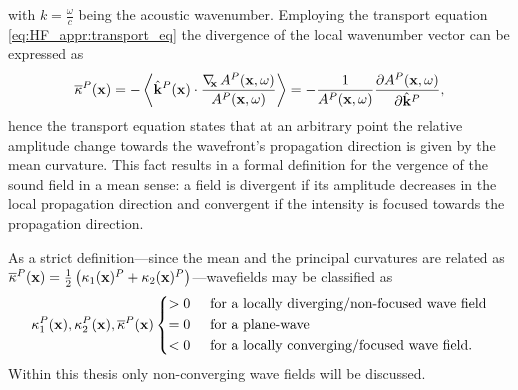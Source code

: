 %
with $k = \frac{\omega}{c}$ being the acoustic wavenumber.
Employing the transport equation \eqref{eq:HF_appr:transport_eq} the divergence of the local wavenumber vector can be expressed as
\begin{equation}
\overline{\kappa}^P(\mathbf{x})
= -\left< \hat{\mathbf{k}}^P(\mathbf{x})\cdot \frac{ \nabla_{\!\!\mathbf{x}}\, A^P(\mathbf{x},\omega) }{A^P(\mathbf{x},\omega)}\right>
= -\frac{ 1 }{ A^P(\mathbf{x},\omega)} \frac{\partial A^P(\mathbf{x},\omega)}{\partial \hat{\mathbf{k}}^P},
\end{equation}
hence the transport equation states that at an arbitrary point the relative amplitude change towards the wavefront's propagation direction is given by the mean curvature.
This fact results in a formal definition for the vergence of the sound field in a mean sense: a field is divergent if its amplitude decreases in the local propagation direction and convergent if the intensity is focused towards the propagation direction.

As a strict definition---since the mean and the principal curvatures are related as $\overline{\kappa}^P(\mathbf{x})  = \frac{1}{2} \left( \kappa_1(\mathbf{x})^P+\kappa_2(\mathbf{x})^P \right)$---wavefields may be classified as
\begin{equation}
\label{eq:HF_appr:curvature_cases}
\kappa_1^P(\vx),\kappa_2^P(\vx),\overline{\kappa}^P(\vx) 
\begin{cases*}
> 0  \hspace{5mm} \text{for a locally diverging/non-focused wave field} \\
= 0  \hspace{5mm} \text{for a plane-wave}  \\
< 0  \hspace{5mm} \text{for a locally converging/focused wave field.} 
\end{cases*}
\end{equation}
Within this thesis only non-converging wave fields will be discussed.

